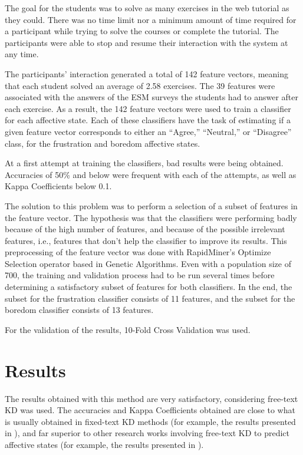 \documentclass[runningheads,a4paper]{llncs}
\begin{document}
The goal for the students was to solve as many exercises in the web tutorial as they could. There was no time limit nor a minimum amount of time required for a participant while trying to solve the courses or complete the tutorial. The participants were able to stop and resume their interaction with the system at any time.

The participants' interaction generated a total of 142 feature vectors, meaning that each student solved an average of 2.58 exercises. The 39 features were associated with the answers of the ESM surveys the students had to answer after each exercise. As a result, the 142 feature vectors were used to train a classifier for each affective state. Each of these classifiers have the task of estimating if a given feature vector corresponds to either an ``Agree,'' ``Neutral,'' or ``Disagree'' class, for the frustration and boredom affective states.

At a first attempt at training the classifiers, bad results were being obtained. Accuracies of 50\% and below were frequent with each of the attempts, as well as Kappa Coefficients below 0.1.

The solution to this problem was to perform a selection of a subset of features in the feature vector. The hypothesis was that the classifiers were performing badly because of the high number of features, and because of the possible irrelevant features, i.e., features that don't help the classifier to improve its results. This preprocessing of the feature vector was done with RapidMiner's Optimize Selection operator based in Genetic Algorithms. Even with a population size of 700, the training and validation process had to be run several times before determining a satisfactory subset of features for both classifiers. In the end, the subset for the frustration classifier consists of 11 features, and the subset for the boredom classifier consists of 13 features.

For the validation of the results, 10-Fold Cross Validation was used.

\section{Results}
\label{results}

The results obtained with this method are very satisfactory, considering free-text KD was used. The accuracies and Kappa Coefficients obtained are close to what is usually obtained in fixed-text KD methods (for example, the results presented in \cite{keystroke-dynamics1}), and far superior to other research works involving free-text KD to predict affective states (for example, the results presented in \cite{keystroke-dynamics2}).
\end{document}
